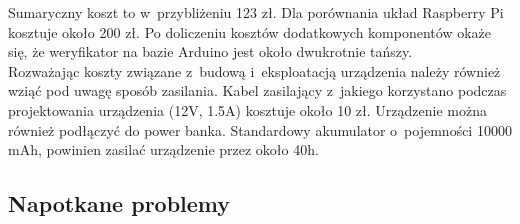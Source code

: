 \documentclass[declaration,shortabstract, mgr]{iithesis}
\begin{document}
\indent Sumaryczny koszt to w~przybliżeniu 123 zł. Dla porównania układ Raspberry Pi kosztuje około 200 zł. Po doliczeniu kosztów dodatkowych komponentów okaże się, że weryfikator na bazie Arduino jest około dwukrotnie tańszy.\\
\indent Rozważając koszty związane z~budową i~eksploatacją urządzenia należy również wziąć pod uwagę sposób zasilania. Kabel zasilający z~jakiego korzystano podczas projektowania urządzenia (12V, 1.5A) kosztuje około 10 zł. Urządzenie można również podłączyć do power banka. Standardowy akumulator o~pojemności 10000 mAh, powinien zasilać urządzenie przez około 40h.

\subsection{Napotkane problemy}
\end{document}
